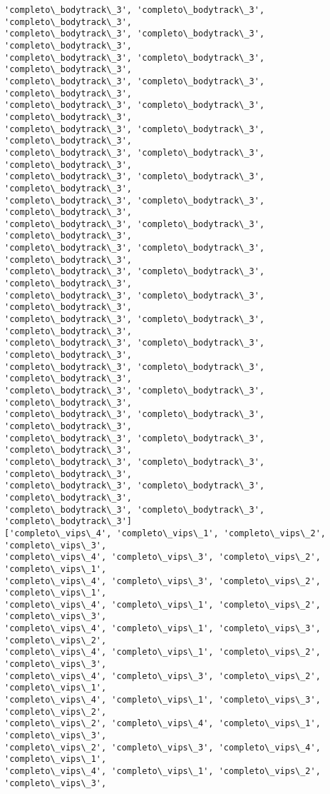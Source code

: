 \documentclass[11pt]{article}
\begin{document}
\begin{Verbatim}[commandchars=\\\{\}]
'completo\_bodytrack\_3', 'completo\_bodytrack\_3', 'completo\_bodytrack\_3',
'completo\_bodytrack\_3', 'completo\_bodytrack\_3', 'completo\_bodytrack\_3',
'completo\_bodytrack\_3', 'completo\_bodytrack\_3', 'completo\_bodytrack\_3',
'completo\_bodytrack\_3', 'completo\_bodytrack\_3', 'completo\_bodytrack\_3',
'completo\_bodytrack\_3', 'completo\_bodytrack\_3', 'completo\_bodytrack\_3',
'completo\_bodytrack\_3', 'completo\_bodytrack\_3', 'completo\_bodytrack\_3',
'completo\_bodytrack\_3', 'completo\_bodytrack\_3', 'completo\_bodytrack\_3',
'completo\_bodytrack\_3', 'completo\_bodytrack\_3', 'completo\_bodytrack\_3',
'completo\_bodytrack\_3', 'completo\_bodytrack\_3', 'completo\_bodytrack\_3',
'completo\_bodytrack\_3', 'completo\_bodytrack\_3', 'completo\_bodytrack\_3',
'completo\_bodytrack\_3', 'completo\_bodytrack\_3', 'completo\_bodytrack\_3',
'completo\_bodytrack\_3', 'completo\_bodytrack\_3', 'completo\_bodytrack\_3',
'completo\_bodytrack\_3', 'completo\_bodytrack\_3', 'completo\_bodytrack\_3',
'completo\_bodytrack\_3', 'completo\_bodytrack\_3', 'completo\_bodytrack\_3',
'completo\_bodytrack\_3', 'completo\_bodytrack\_3', 'completo\_bodytrack\_3',
'completo\_bodytrack\_3', 'completo\_bodytrack\_3', 'completo\_bodytrack\_3',
'completo\_bodytrack\_3', 'completo\_bodytrack\_3', 'completo\_bodytrack\_3',
'completo\_bodytrack\_3', 'completo\_bodytrack\_3', 'completo\_bodytrack\_3',
'completo\_bodytrack\_3', 'completo\_bodytrack\_3', 'completo\_bodytrack\_3',
'completo\_bodytrack\_3', 'completo\_bodytrack\_3', 'completo\_bodytrack\_3',
'completo\_bodytrack\_3', 'completo\_bodytrack\_3', 'completo\_bodytrack\_3',
'completo\_bodytrack\_3', 'completo\_bodytrack\_3', 'completo\_bodytrack\_3']
['completo\_vips\_4', 'completo\_vips\_1', 'completo\_vips\_2', 'completo\_vips\_3',
'completo\_vips\_4', 'completo\_vips\_3', 'completo\_vips\_2', 'completo\_vips\_1',
'completo\_vips\_4', 'completo\_vips\_3', 'completo\_vips\_2', 'completo\_vips\_1',
'completo\_vips\_4', 'completo\_vips\_1', 'completo\_vips\_2', 'completo\_vips\_3',
'completo\_vips\_4', 'completo\_vips\_1', 'completo\_vips\_3', 'completo\_vips\_2',
'completo\_vips\_4', 'completo\_vips\_1', 'completo\_vips\_2', 'completo\_vips\_3',
'completo\_vips\_4', 'completo\_vips\_3', 'completo\_vips\_2', 'completo\_vips\_1',
'completo\_vips\_4', 'completo\_vips\_1', 'completo\_vips\_3', 'completo\_vips\_2',
'completo\_vips\_2', 'completo\_vips\_4', 'completo\_vips\_1', 'completo\_vips\_3',
'completo\_vips\_2', 'completo\_vips\_3', 'completo\_vips\_4', 'completo\_vips\_1',
'completo\_vips\_4', 'completo\_vips\_1', 'completo\_vips\_2', 'completo\_vips\_3',

\end{Verbatim}
\end{document}
